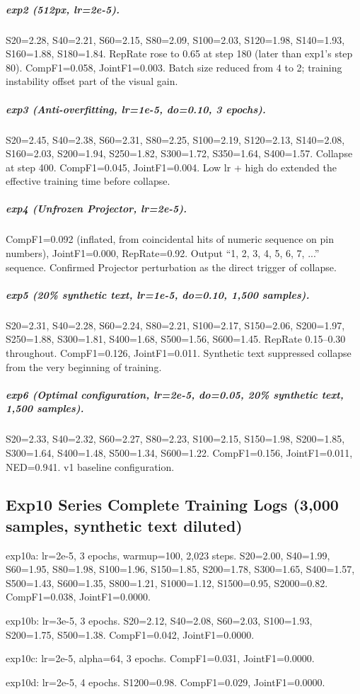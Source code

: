 \subparagraph{exp2 (512px, lr=2e-5).}
S20=2.28, S40=2.21, S60=2.15, S80=2.09, S100=2.03, S120=1.98, S140=1.93, S160=1.88, S180=1.84. RepRate rose to 0.65 at step 180 (later than exp1's step 80). CompF1=0.058, JointF1=0.003. Batch size reduced from 4 to 2; training instability offset part of the visual gain.

\subparagraph{exp3 (Anti-overfitting, lr=1e-5, do=0.10, 3 epochs).}
S20=2.45, S40=2.38, S60=2.31, S80=2.25, S100=2.19, S120=2.13, S140=2.08, S160=2.03, S200=1.94, S250=1.82, S300=1.72, S350=1.64, S400=1.57. Collapse at step 400. CompF1=0.045, JointF1=0.004. Low lr + high do extended the effective training time before collapse.

\subparagraph{exp4 (Unfrozen Projector, lr=2e-5).}
CompF1=0.092 (inflated, from coincidental hits of numeric sequence on pin numbers), JointF1=0.000, RepRate=0.92. Output ``1, 2, 3, 4, 5, 6, 7, ...'' sequence. Confirmed Projector perturbation as the direct trigger of collapse.

\subparagraph{exp5 (20\% synthetic text, lr=1e-5, do=0.10, 1,500 samples).}
S20=2.31, S40=2.28, S60=2.24, S80=2.21, S100=2.17, S150=2.06, S200=1.97, S250=1.88, S300=1.81, S400=1.68, S500=1.56, S600=1.45. RepRate 0.15--0.30 throughout. CompF1=0.126, JointF1=0.011. Synthetic text suppressed collapse from the very beginning of training.

\subparagraph{exp6 (Optimal configuration, lr=2e-5, do=0.05, 20\% synthetic text, 1,500 samples).}
S20=2.33, S40=2.32, S60=2.27, S80=2.23, S100=2.15, S150=1.98, S200=1.85, S300=1.64, S400=1.48, S500=1.34, S600=1.22. CompF1=0.156, JointF1=0.011, NED=0.941. v1 baseline configuration.

\subsection{Exp10 Series Complete Training Logs (3,000 samples, synthetic text diluted)}

exp10a: lr=2e-5, 3 epochs, warmup=100, 2,023 steps. S20=2.00, S40=1.99, S60=1.95, S80=1.98, S100=1.96, S150=1.85, S200=1.78, S300=1.65, S400=1.57, S500=1.43, S600=1.35, S800=1.21, S1000=1.12, S1500=0.95, S2000=0.82. CompF1=0.038, JointF1=0.0000.

exp10b: lr=3e-5, 3 epochs. S20=2.12, S40=2.08, S60=2.03, S100=1.93, S200=1.75, S500=1.38. CompF1=0.042, JointF1=0.0000.

exp10c: lr=2e-5, alpha=64, 3 epochs. CompF1=0.031, JointF1=0.0000.

exp10d: lr=2e-5, 4 epochs. S1200=0.98. CompF1=0.029, JointF1=0.0000.

